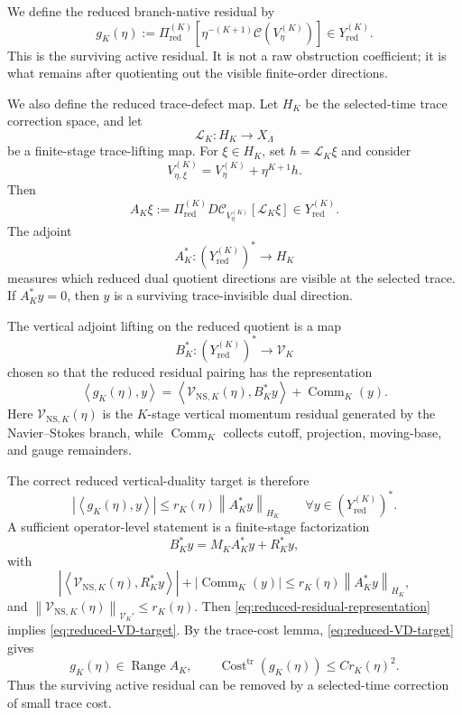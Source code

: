 \documentclass[11pt]{article}
\numberwithin{equation}{section}
\DeclareMathOperator{\Range}{Range}
\DeclareMathOperator{\Cost}{Cost}
\newcommand{\trc}{\mathrm{tr}}
\newcommand{\NS}{\mathrm{NS}}
\newcommand{\norm}[2]{\left\|#1\right\|_{#2}}
\newcommand{\ip}[2]{\left\langle #1,#2\right\rangle}
\newcommand{\calC}{\mathcal C}
\newcommand{\calL}{\mathcal L}
\newcommand{\calV}{\mathcal V}
\begin{document}
We define the reduced branch-native residual by
\begin{equation}\label{eq:gK-def}
g_K(\eta)
:=
\Pi_{\mathrm{red}}^{(K)}
\left[\eta^{-(K+1)}\calC(V_\eta^{(K)})\right]
\in Y_{\mathrm{red}}^{(K)}.
\end{equation}
This is the surviving active residual.  It is not a raw obstruction coefficient; it is what remains after quotienting out the visible finite-order directions.

We also define the reduced trace-defect map.  Let \(H_K\) be the selected-time trace correction space, and let
\[
\calL_K:H_K\to X_\Lambda
\]
be a finite-stage trace-lifting map.  For \(\xi\in H_K\), set \(h=\calL_K\xi\) and consider
\[
V_{\eta,\xi}^{(K)}=V_\eta^{(K)}+\eta^{K+1}h.
\]
Then
\begin{equation}\label{eq:AK-def}
A_K\xi
:=
\Pi_{\mathrm{red}}^{(K)}
D\calC_{V_\eta^{(K)}}[\calL_K\xi]
\in Y_{\mathrm{red}}^{(K)}.
\end{equation}
The adjoint
\[
A_K^*:(Y_{\mathrm{red}}^{(K)})^*\to H_K
\]
measures which reduced dual quotient directions are visible at the selected trace.  If \(A_K^*y=0\), then \(y\) is a surviving trace-invisible dual direction.

The vertical adjoint lifting on the reduced quotient is a map
\[
B_K^*:(Y_{\mathrm{red}}^{(K)})^*\to\calV_K
\]
chosen so that the reduced residual pairing has the representation
\begin{equation}\label{eq:reduced-residual-representation}
\ip{g_K(\eta)}{y}
=
\ip{\calV_{\NS,K}(\eta)}{B_K^*y}
+
\operatorname{Comm}_K(y).
\end{equation}
Here \(\calV_{\NS,K}(\eta)\) is the \(K\)-stage vertical momentum residual generated by the Navier--Stokes branch, while \(\operatorname{Comm}_K\) collects cutoff, projection, moving-base, and gauge remainders.

The correct reduced vertical-duality target is therefore
\begin{equation}\label{eq:reduced-VD-target}
|\ip{g_K(\eta)}{y}|
\le
r_K(\eta)\norm{A_K^*y}{H_K}
\qquad
\forall y\in (Y_{\mathrm{red}}^{(K)})^*.
\end{equation}
A sufficient operator-level statement is a finite-stage factorization
\begin{equation}\label{eq:BK-factor-sufficient}
B_K^*y=M_KA_K^*y+R_K^*y,
\end{equation}
with
\[
\left|\ip{\calV_{\NS,K}(\eta)}{R_K^*y}\right|
+|\operatorname{Comm}_K(y)|
\le
r_K(\eta)\norm{A_K^*y}{H_K},
\]
and \(\norm{\calV_{\NS,K}(\eta)}{\calV_K'}\le r_K(\eta)\).  Then \eqref{eq:reduced-residual-representation} implies \eqref{eq:reduced-VD-target}.  By the trace-cost lemma, \eqref{eq:reduced-VD-target} gives
\begin{equation}\label{eq:reduced-trace-cost-consequence}
g_K(\eta)\in\Range A_K,
\qquad
\Cost^{\trc}(g_K(\eta))\le C r_K(\eta)^2.
\end{equation}
Thus the surviving active residual can be removed by a selected-time correction of small trace cost.
\end{document}

